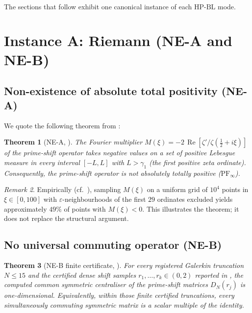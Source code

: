 \documentclass[11pt]{article}
\newtheorem{theorem}{Theorem}[section]
\theoremstyle{definition}
\theoremstyle{remark}
\newtheorem{remark}[theorem]{Remark}
\newcommand{\HBL}{\mathrm{HP\text{-}BL}}
\renewcommand{\Re}{\operatorname{Re}}
\newcommand{\halfline}{\tfrac{1}{2}}
\begin{document}
The sections that follow exhibit one canonical instance of each
$\HBL$ mode.

\section{Instance A: Riemann (NE-A and NE-B)}
\label{sec:riemann}

\subsection{Non-existence of absolute total positivity (NE-A)}
\label{sec:ne-a}

We quote the following theorem from \cite{Geiger2026RHII}:

\begin{theorem}[NE-A, {\cite[Thm.~NE-A]{Geiger2026RHII}}]\label{thm:NE-A}
The Fourier multiplier
$M(\xi) = -2\,\Re[\zeta'/\zeta(\halfline + i\xi)]$
of the prime-shift operator takes negative values on a set of
positive Lebesgue measure in every interval $[-L, L]$ with $L > \gamma_1$
(the first positive zeta ordinate). Consequently, the prime-shift
operator is not absolutely totally positive ($\mathrm{PF}_\infty$).
\end{theorem}

\begin{remark}\label{rem:ne-a-empirical}
Empirically (cf.\ \cite[\S4.2]{Geiger2026RHII}), sampling $M(\xi)$
on a uniform grid of $10^4$ points in $\xi \in [0,100]$ with
$\varepsilon$-neighbourhoods of the first $29$ ordinates excluded
yields approximately $49\%$ of points with $M(\xi) < 0$. This
illustrates the theorem; it does not replace the structural argument.
\end{remark}

\subsection{No universal commuting operator (NE-B)}
\label{sec:ne-b}

\begin{theorem}[NE-B finite certificate, {\cite[Thm.~NE-B]{Geiger2026RHII}}]\label{thm:NE-B}
For every registered Galerkin truncation $N \leq 15$ and the certified
dense shift samples $r_1, \ldots, r_k \in (0,2)$ reported in
\cite{Geiger2026RHII}, the computed common symmetric centraliser of
the prime-shift matrices $D_N(r_j)$ is one-dimensional. Equivalently,
within those finite certified truncations, every simultaneously
commuting symmetric matrix is a scalar multiple of the identity.
\end{theorem}
\end{document}
